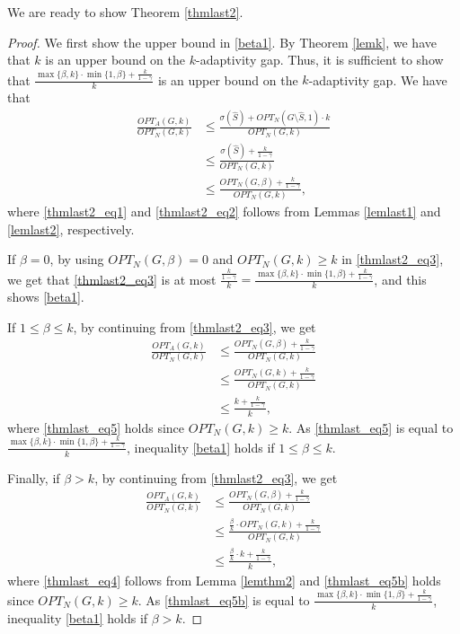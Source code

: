 We are ready to show Theorem \ref{thmlast2}.
\begin{proof}
We first show the upper bound in \eqref{beta1}. By Theorem \ref{lemk}, we have that $k$ is an upper bound on the $k$-adaptivity gap. Thus, it is sufficient to show that $\frac{\max\{\beta,k\}\cdot \min\{1,\beta\}+\frac{k}{1-\gamma}}{k}$ is an upper bound on the $k$-adaptivity gap. We have that
\begin{align}
\frac{OPT_A(G,k)}{OPT_N(G,k)}&\leq \frac{\sigma(\hat{S})+OPT_N(G\setminus \hat{S},1)\cdot k}{OPT_N(G,k)}\label{thmlast2_eq1}\\
&\leq \frac{\sigma(\hat{S})+\frac{k}{1-\gamma}}{OPT_N(G,k)}\label{thmlast2_eq2}\\
&\leq \frac{OPT_N(G,\beta)+\frac{k}{1-\gamma}}{OPT_N(G,k)},\label{thmlast2_eq3}
\end{align}
where \eqref{thmlast2_eq1} and \eqref{thmlast2_eq2} follows from Lemmas \ref{lemlast1} and \ref{lemlast2}, respectively.

If $\beta=0$, by using $OPT_N(G,\beta)=0$ and $OPT_N(G,k)\geq k$ in \eqref{thmlast2_eq3}, we get that \eqref{thmlast2_eq3} is at most $\frac{\frac{k}{1-\gamma}}{k}=\frac{\max\{\beta,k\}\cdot \min\{1,\beta\}+\frac{k}{1-\gamma}}{k}$, and this shows \eqref{beta1}.

If $1\leq \beta\leq k$, by continuing from \eqref{thmlast2_eq3}, we get
\begin{align}
\frac{OPT_A(G,k)}{OPT_N(G,k)}&\leq \frac{OPT_N(G,\beta)+\frac{k}{1-\gamma}}{OPT_N(G,k)}\nonumber\\
&\leq \frac{OPT_N(G,k)+\frac{k}{1-\gamma}}{OPT_N(G,k)}\nonumber\\
&\leq \frac{k+\frac{k}{1-\gamma}}{k}\label{thmlast_eq5},
\end{align}
where \eqref{thmlast_eq5} holds since $OPT_N(G,k)\geq k$. As \eqref{thmlast_eq5} is equal to $\frac{\max\{\beta,k\}\cdot \min\{1,\beta\}+\frac{k}{1-\gamma}}{k}$, inequality \eqref{beta1} holds if $1\leq \beta\leq k$. 

Finally, if $\beta> k$, by continuing from \eqref{thmlast2_eq3}, we get
\begin{align}
\frac{OPT_A(G,k)}{OPT_N(G,k)}&\leq \frac{OPT_N(G,\beta)+\frac{k}{1-\gamma}}{OPT_N(G,k)}\nonumber\\
&\leq \frac{\frac{\beta}{k}\cdot OPT_N(G,k)+\frac{k}{1-\gamma}}{OPT_N(G,k)}\label{thmlast_eq4}\\
&\leq \frac{\frac{\beta}{k}\cdot k+\frac{k}{1-\gamma}}{k}\label{thmlast_eq5b},
\end{align}
where \eqref{thmlast_eq4} follows from Lemma \ref{lemthm2} and \eqref{thmlast_eq5b} holds since $OPT_N(G,k)\geq k$. As \eqref{thmlast_eq5b} is equal to $\frac{\max\{\beta,k\}\cdot \min\{1,\beta\}+\frac{k}{1-\gamma}}{k}$, inequality \eqref{beta1} holds if $\beta> k$. 


\end{proof}
